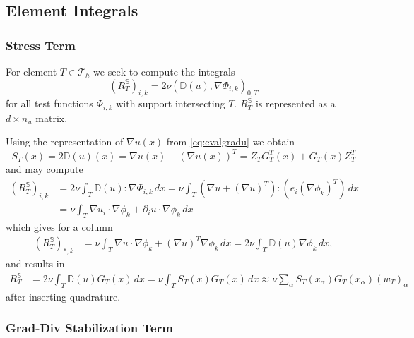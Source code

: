 \documentclass[a4paper,12pt]{article}
\theoremstyle{definition}
\begin{document}
\subsection{Element Integrals}

\subsubsection*{Stress Term}

For element $T\in\mathcal{T}_h$ we seek to compute the integrals 
$$(R^\mathbb{S}_T)_{i,k} = 2\nu(\mathbb{D}(u),\nabla\Phi_{i,k})_{0,T}$$ for all test functions $\Phi_{i,k}$
with support intersecting $T$. $R^\mathbb{S}_T$ is represented as a $d\times n_u$ matrix.

Using the representation of $\nabla u(x)$ from \eqref{eq:evalgradu} we obtain
\begin{equation}
S_T(x) = 2\mathbb{D}(u)(x) = \nabla u(x) + (\nabla u(x))^T
= Z_T G^T_T(x) + G_T(x) Z^T_T 
\end{equation}
and may compute
\begin{equation*}
\begin{split}
\left(R^\mathbb{S}_T \right)_{i,k} &= 2\nu \int_T \mathbb{D}(u) : \nabla\Phi_{i,k} \, dx
= \nu \int_T (\nabla u + (\nabla u)^T) :( e_i (\nabla\phi_k)^T) \, dx \\
&= \nu \int_T \nabla u_i \cdot \nabla\phi_k + \partial_i u \cdot \nabla\phi_k \, dx
\end{split}
\end{equation*}
which gives for a column
\begin{equation*}
\begin{split}
\left(R^\mathbb{S}_T \right)_{\ast,k} 
&= \nu \int_T \nabla u \cdot \nabla\phi_k + (\nabla u)^T \nabla\phi_k \, dx
= 2\nu \int_T \mathbb{D}(u) \nabla\phi_k \, dx,
\end{split}
\end{equation*}
and results in
\begin{equation}
\begin{split}
R^\mathbb{S}_T &= 2\nu \int_T \mathbb{D}(u) G_T(x) \, dx = \nu \int_T S_T(x) G_T(x) \, dx 
\approx \nu \sum_\alpha S_T(x_\alpha) G_T(x_\alpha) (w_T)_\alpha
\end{split}
\end{equation}
after inserting quadrature.

\subsubsection*{Grad-Div Stabilization Term}
\end{document}
